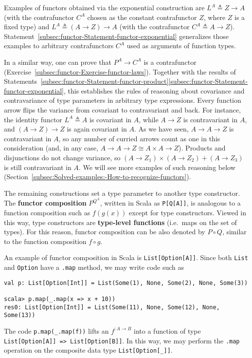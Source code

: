 Examples of functors obtained via the exponential
construction are $L^{A}\triangleq Z\rightarrow A$ (with the contrafunctor
$C^{A}$ chosen as the constant contrafunctor $Z$, where $Z$ is
a fixed type) and $L^{A}\triangleq\left(A\rightarrow Z\right)\rightarrow A$
(with the contrafunctor $C^{A}\triangleq A\rightarrow Z$). Statement~\ref{subsec:functor-Statement-functor-exponential}
generalizes those examples to arbitrary contrafunctors $C^{A}$ used
as arguments of function types.

In a similar way, one can prove that $P^{A}\rightarrow C^{A}$ is
a contrafunctor (Exercise~\ref{subsec:functor-Exercise-functor-laws}).
Together with the results of Statements~\ref{subsec:functor-Statement-functor-product}\textendash \ref{subsec:functor-Statement-functor-exponential},
this establishes the rules of reasoning about covariance and contravariance
of type parameters in arbitrary type expressions. Every function arrow
flips the variance from covariant to contravariant and back. For instance,
the identity functor $L^{A}\triangleq A$ is covariant in $A$, while
$A\rightarrow Z$ is contravariant in $A$, and $\left(A\rightarrow Z\right)\rightarrow Z$
is again covariant in $A$. As we have seen, $A\rightarrow A\rightarrow Z$
is contravariant in $A$, so any number of curried arrows count as
one in this consideration (and, in any case, $A\rightarrow A\rightarrow Z\cong A\times A\rightarrow Z$).
Products and disjunctions do not change variance, so $\left(A\rightarrow Z_{1}\right)\times\left(A\rightarrow Z_{2}\right)+\left(A\rightarrow Z_{3}\right)$
is still contravariant in $A$. We will see more examples of such
reasoning below (Section~\ref{subsec:Solved-examples:-How-to-recognize-functors}).

The remaining constructions set a type parameter to another type constructor.
The \textbf{functor composition} $P^{Q^{A}}$,
written in Scala as \lstinline!P[Q[A]]!, is analogous to a function
composition such as $f(g(x))$ except for type constructors. Viewed
in this way, type constructors are \textbf{type-level functions}
(i.e.~maps on the set of types). For this reason, functor composition
can be also denoted by $P\circ Q$, similar to the function composition
$f\circ g$.

An example of functor composition in Scala is \lstinline!List[Option[A]]!.
Since both \lstinline!List! and \lstinline!Option! have a \lstinline!.map!
method, we may write code such as
\begin{lstlisting}
val p: List[Option[Int]] = List(Some(1), None, Some(2), None, Some(3))

scala> p.map(_.map(x => x + 10))
res0: List[Option[Int]] = List(Some(11), None, Some(12), None, Some(13)) 
\end{lstlisting}
The code \lstinline!p.map(_.map(f))! lifts an $f^{:A\rightarrow B}$
into a function of type \lstinline!List[Option[A]] => List[Option[B]]!.
In this way, we may perform the \lstinline!.map! operation on the
composite data type \lstinline!List[Option[_]]!. 

